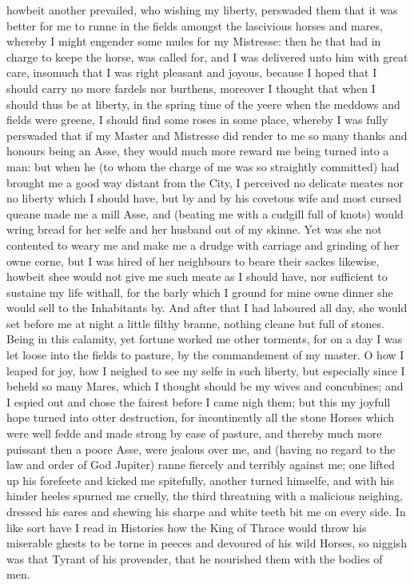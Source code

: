howbeit another prevailed, who wishing my liberty, perswaded them that it was
better for me to runne in the fields amongst the lascivious horses and mares,
whereby I might engender some mules for my Mistresse: then he that had in
charge to keepe the horse, was called for, and I was delivered unto him with
great care, insomuch that I was right pleasant and joyous, because I hoped that
I should carry no more fardels nor burthens, moreover I thought that when I
should thus be at liberty, in the spring time of the yeere when the meddows and
fields were greene, I should find some roses in some place, whereby I was fully
perswaded that if my Master and Mistresse did render to me so many thanks and
honours being an Asse, they would much more reward me being turned into a man:
but when he (to whom the charge of me was so straightly committed) had brought
me a good way distant from the City, I perceived no delicate meates nor no
liberty which I should have, but by and by his covetous wife and most cursed
queane made me a mill Asse, and (beating me with a cudgill full of knots) would
wring bread for her selfe and her husband out of my skinne. Yet was she not
contented to weary me and make me a drudge with carriage and grinding of her
owne corne, but I was hired of her neighbours to beare their sackes likewise,
howbeit shee would not give me such meate as I should have, nor sufficient to
sustaine my life withall, for the barly which I ground for mine owne dinner she
would sell to the Inhabitants by. And after that I had laboured all day, she
would set before me at night a little filthy branne, nothing cleane but full of
stones. Being in this calamity, yet fortune worked me other torments, for on a
day I was let loose into the fields to pasture, by the commandement of my
master. O how I leaped for joy, how I neighed to see my selfe in such liberty,
but especially since I beheld so many Mares, which I thought should be my wives
and concubines; and I espied out and chose the fairest before I came nigh them;
but this my joyfull hope turned into otter destruction, for incontinently all
the stone Horses which were well fedde and made strong by ease of pasture, and
thereby much more puissant then a poore Asse, were jealous over me, and (having
no regard to the law and order of God Jupiter) ranne fiercely and terribly
against me; one lifted up his forefeete and kicked me spitefully, another
turned himselfe, and with his hinder heeles spurned me cruelly, the third
threatning with a malicious neighing, dressed his eares and shewing his sharpe
and white teeth bit me on every side. In like sort have I read in Histories how
the King of Thrace would throw his miserable ghests to be torne in peeces and
devoured of his wild Horses, so niggish was that Tyrant of his provender, that
he nourished them with the bodies of men.

